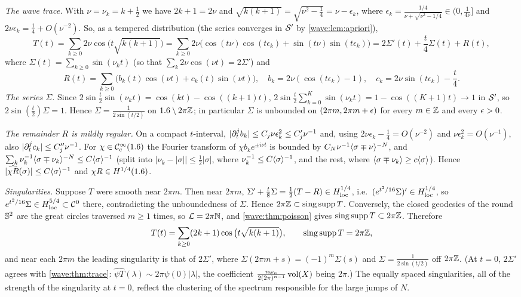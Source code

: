 \emph{The wave trace.} With $\nu=\nu_k=k+\frac12$ we have $2k+1=2\nu$ and
$\sqrt{k(k+1)}=\sqrt{\nu^2-\frac14}=\nu-\epsilon_k$, where
$\epsilon_k=\frac{1/4}{\nu+\sqrt{\nu^2-1/4}}\in(0,\frac1{4\nu}]$ and $2\nu\epsilon_k=\frac14+O(\nu^{-2})$. So,
as a tempered distribution (the series converges in $\mathcal{S}'$ by \cref{wave:lem:apriori}),
\begin{equation*}
  T(t)=\sum_{k\ge0}2\nu\cos\big(t\sqrt{k(k+1)}\big)
  =\sum_{k\ge0}2\nu\big(\cos(t\nu)\cos(t\epsilon_k)+\sin(t\nu)\sin(t\epsilon_k)\big)
  =2\Sigma'(t)+\frac t4\Sigma(t)+R(t),
\end{equation*}
where $\Sigma(t)=\sum_{k\ge0}\sin(\nu_kt)$ (so that $\sum_k2\nu\cos(\nu t)=2\Sigma'$) and
\begin{equation*}
  R(t)=\sum_{k\ge0}\Big(b_k(t)\cos(\nu t)+c_k(t)\sin(\nu t)\Big),\quad
  b_k=2\nu(\cos(t\epsilon_k)-1),\quad c_k=2\nu\sin(t\epsilon_k)-\frac t4 .
\end{equation*}
\emph{The series $\Sigma$.} Since $2\sin\frac t2\sin(\nu_kt)=\cos(kt)-\cos((k+1)t)$,
$2\sin\frac t2\sum_{k=0}^K\sin(\nu_kt)=1-\cos((K+1)t)\to1$ in $\mathcal{S}'$, so $2\sin(\frac t2)\Sigma=1$. Hence
$\Sigma=\frac1{2\sin(t/2)}$ on $1.6\setminus2\pi\mathbb{Z}$; in particular $\Sigma$ is unbounded on
$(2\pi m,2\pi m+\epsilon)$ for every $m\in\mathbb{Z}$ and every $\epsilon>0$.

\emph{The remainder $R$ is mildly regular.} On a compact $t$-interval, $|\partial_t^jb_k|\le C_j\nu\epsilon_k^2\le C_j'\nu^{-1}$
and, using $2\nu\epsilon_k-\frac14=O(\nu^{-2})$ and $\nu\epsilon_k^2=O(\nu^{-1})$, also $|\partial_t^jc_k|\le C_j''\nu^{-1}$.
For $\chi\in\mathcal{C}^\infty_{\mathrm{c}}(1.6)$ the Fourier transform of $\chi b_ke^{\pm i\nu t}$ is bounded by
$C_N\nu^{-1}\langle \sigma\mp\nu\rangle^{-N}$, and $\sum_k\nu_k^{-1}\langle \sigma\mp\nu_k\rangle^{-N}\le C\langle \sigma\rangle^{-1}$ (split into
$|\nu_k-|\sigma||\le\frac12|\sigma|$, where $\nu_k^{-1}\le C\langle \sigma\rangle^{-1}$, and the rest, where
$\langle \sigma\mp\nu_k\rangle\ge c\langle \sigma\rangle$). Hence $|\widehat{\chi R}(\sigma)|\le C\langle \sigma\rangle^{-1}$ and $\chi R\in H^{1/4}(1.6)$.

\emph{Singularities.} Suppose $T$ were smooth near $2\pi m$. Then near $2\pi m$,
$\Sigma'+\frac t8\Sigma=\frac12(T-R)\in H^{1/4}_{\mathrm{loc}}$, i.e.\ $(e^{t^2/16}\Sigma)'\in H^{1/4}_{\mathrm{loc}}$, so
$e^{t^2/16}\Sigma\in H^{5/4}_{\mathrm{loc}}\subset\mathcal{C}^0$ there, contradicting the unboundedness of $\Sigma$.
Hence $2\pi\mathbb{Z}\subset\operatorname{sing\,supp} T$. Conversely, the closed geodesics of the round $\mathbb{S}^2$ are the great
circles traversed $m\ge1$ times, so $\mathcal{L}=2\pi\mathbb{N}$, and \cref{wave:thm:poisson} gives
$\operatorname{sing\,supp} T\subset2\pi\mathbb{Z}$. Therefore
\begin{equation*}
  T(t)=\sum_{k\ge0}(2k+1)\cos\big(t\sqrt{k(k+1)}\big),\qquad \operatorname{sing\,supp} T=2\pi\mathbb{Z},
\end{equation*}
and near each $2\pi m$ the leading singularity is that of $2\Sigma'$, where
$\Sigma(2\pi m+s)=(-1)^m\Sigma(s)$ and $\Sigma=\frac1{2\sin(t/2)}$ off $2\pi\mathbb{Z}$. (At $t=0$, $2\Sigma'$ agrees
with \cref{wave:thm:trace}: $\widehat{\psi T}(\lambda)\sim2\pi\psi(0)|\lambda|$, the coefficient
$\frac{n\omega_n}{2(2\pi)^{n-1}}\operatorname{vol}(X)$ being $2\pi$.) The equally spaced singularities, all of the
strength of the singularity at $t=0$, reflect the clustering of the spectrum responsible for the large
jumps of $N$.


